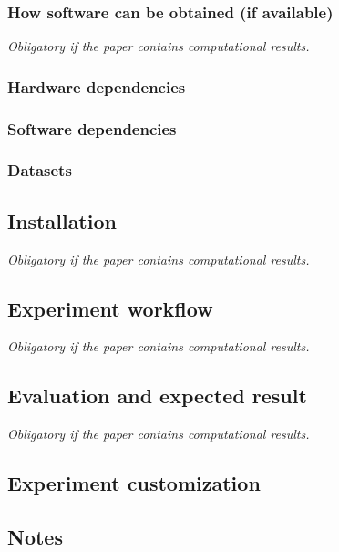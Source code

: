 \subsubsection{How software can be obtained (if available)}

{\em Obligatory if the paper contains computational results.}

\subsubsection{Hardware dependencies}

\subsubsection{Software dependencies}

\subsubsection{Datasets}

\subsection{Installation}

{\em Obligatory if the paper contains computational results.}

\subsection{Experiment workflow}

{\em Obligatory if the paper contains computational results.}

\subsection{Evaluation and expected result}

{\em Obligatory if the paper contains computational results.}

\subsection{Experiment customization}

\subsection{Notes}
